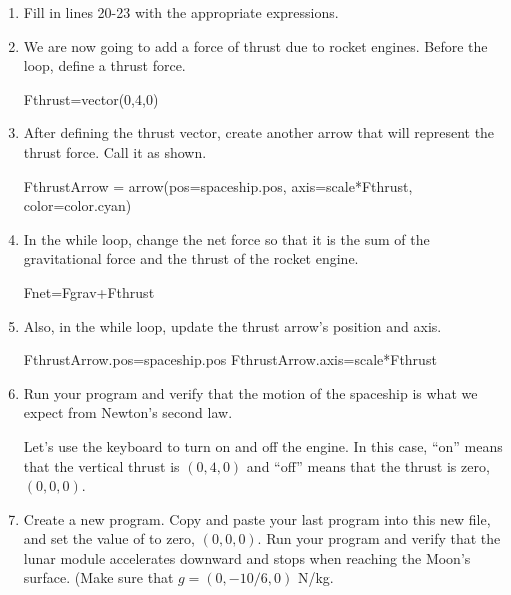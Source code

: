 \begin{enumerate}
\item Fill in lines 20-23 with the appropriate expressions.

\item We are now going to add a force of thrust due to rocket engines. Before the  loop, define a thrust force.

\begin{myvpython}
Fthrust=vector(0,4,0)
\end{myvpython}

\item After defining the thrust vector, create another arrow that will represent the thrust force. Call it  as shown.

\begin{myvpython}
FthrustArrow = arrow(pos=spaceship.pos, axis=scale*Fthrust, color=color.cyan)
\end{myvpython}

\item In the while loop, change the net force so that it is the sum of the gravitational force and the thrust of the rocket engine.

\begin{myvpython}
        Fnet=Fgrav+Fthrust
\end{myvpython}

\item Also, in the while loop, update the thrust arrow's position and axis.

\begin{myvpython}
        FthrustArrow.pos=spaceship.pos
        FthrustArrow.axis=scale*Fthrust
\end{myvpython}

\item Run your program and verify that the motion of the spaceship is what we expect from Newton's second law. 


Let's use the keyboard to turn on and off the engine. In this case, ``on'' means that the vertical thrust is $(0,4,0)$ and ``off'' means that the thrust is zero, $(0,0,0)$. 

\item Create a new program. Copy and paste your last program into this new file, and set the value of  to zero, $(0,0,0)$. Run your program and verify that the lunar module accelerates downward and stops when reaching the Moon's surface. (Make sure that $g=(0,-10/6,0)$ N/kg.


\end{enumerate}
